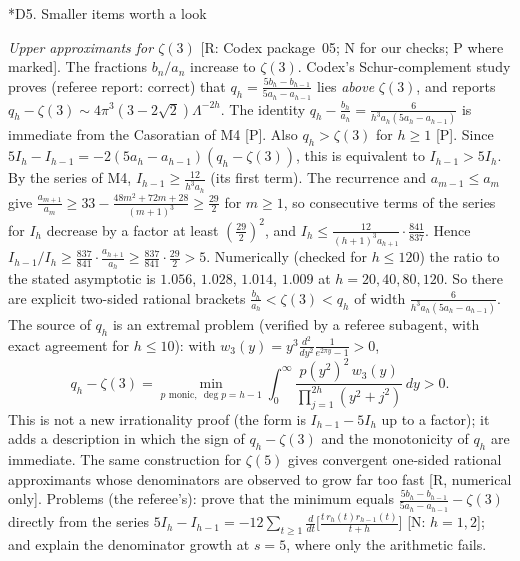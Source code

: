 \documentclass[11pt,a4paper]{article}
\makeatletter
\newcommand{\dd}{\,d}
\newcommand{\st}[1]{\textsf{[#1]}}
\theoremstyle{definition}
\renewcommand\section{\@startsection{section}{1}{\z@}{-2.2ex plus -.6ex minus -.2ex}{1.1ex plus .2ex}{\normalfont\large\bfseries}}
\makeatother
\begin{document}
\section*{D5. Smaller items worth a look}

\emph{Upper approximants for $\zeta(3)$} \st{R: Codex package~05; N for our checks; P where marked}. The fractions $b_n/a_n$
increase to $\zeta(3)$. Codex's Schur-complement study proves (referee report: correct) that
$q_h=\frac{5b_h-b_{h-1}}{5a_h-a_{h-1}}$ lies \emph{above} $\zeta(3)$, and reports
$q_h-\zeta(3)\sim4\pi^3(3-2\sqrt2)\Lambda^{-2h}$. The identity
$q_h-\frac{b_h}{a_h}=\frac6{h^3a_h(5a_h-a_{h-1})}$ is immediate from the Casoratian of M4 \st{P}.
Also $q_h>\zeta(3)$ for $h\ge1$ \st{P}. Since $5I_h-I_{h-1}=-2(5a_h-a_{h-1})(q_h-\zeta(3))$, this
is equivalent to $I_{h-1}>5I_h$. By the series of M4, $I_{h-1}\ge\frac{12}{h^3a_h}$ (its first
term). The recurrence and $a_{m-1}\le a_m$ give
$\frac{a_{m+1}}{a_m}\ge33-\frac{48m^2+72m+28}{(m+1)^3}\ge\frac{29}2$ for $m\ge1$, so consecutive terms
of the series for $I_h$ decrease by a factor at least $(\frac{29}2)^2$, and
$I_h\le\frac{12}{(h+1)^3a_{h+1}}\cdot\frac{841}{837}$. Hence
$I_{h-1}/I_h\ge\frac{837}{841}\cdot\frac{a_{h+1}}{a_h}\ge\frac{837}{841}\cdot\frac{29}2>5$.
Numerically (checked for $h\le120$) the ratio to the stated asymptotic is
$1.056$, $1.028$, $1.014$, $1.009$ at $h=20,40,80,120$. So there are explicit two-sided rational
brackets $\frac{b_h}{a_h}<\zeta(3)<q_h$ of width $\frac6{h^3a_h(5a_h-a_{h-1})}$. The source of
$q_h$ is an extremal problem (verified by a referee subagent, with exact agreement for
$h\le10$): with
$w_3(y)=y^3\frac{d^2}{dy^2}\frac1{e^{2\pi y}-1}>0$,
\[
q_h-\zeta(3)=\min_{p\text{ monic},\ \deg p=h-1}\int_0^\infty\frac{p(y^2)^2\,w_3(y)}{\prod_{j=1}^{2h}(y^2+j^2)}\dd y>0 .
\]
This is not a new irrationality proof (the form is $I_{h-1}-5I_h$ up to a factor); it adds a
description in which the sign of $q_h-\zeta(3)$ and the monotonicity of $q_h$ are immediate. The same
construction for $\zeta(5)$ gives convergent one-sided rational approximants whose denominators are
observed to grow far too fast \st{R, numerical only}. Problems (the referee's): prove that the minimum equals
$\frac{5b_h-b_{h-1}}{5a_h-a_{h-1}}-\zeta(3)$ directly from the series
$5I_h-I_{h-1}=-12\sum_{t\ge1}\frac d{dt}\bigl[\frac{t\,r_h(t)r_{h-1}(t)}{t+h}\bigr]$ \st{N: $h=1,2$};
and explain the denominator growth at $s=5$, where
only the arithmetic fails.
\end{document}
